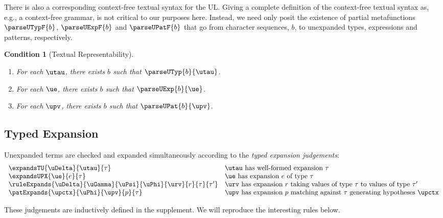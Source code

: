 \documentclass[acmsmall,10pt,review,anonymous]{acmart}\settopmatter{printfolios=true}
\newtheorem{condition}[theorem]{Condition}
\begin{document}
There is also a corresponding context-free textual syntax for the UL. 
Giving a complete definition of the context-free textual syntax as, e.g., a context-free grammar, is not critical to our purposes here. 
Instead, we need only posit the existence of partial metafunctions $\parseUTypF{b}$, $\parseUExpF{b}$ and $\parseUPatF{b}$  that go from character sequences, $b$, to unexpanded types, expressions and patterns, respectively. 
\begin{condition}[Textual Representability] ~
\begin{enumerate}[nolistsep]
\item For each $\utau$, there exists $b$ such that $\parseUTyp{b}{\utau}$. 
\item For each $\ue$, there exists $b$ such that $\parseUExp{b}{\ue}$.
\item For each $\upv$, there exists $b$ such that $\parseUPat{b}{\upv}$.
\end{enumerate}
\end{condition}

\subsection{Typed Expansion}\label{sec:typed-expansion-U}
Unexpanded terms are checked and expanded simultaneously according to the \emph{typed expansion judgements}:
\[\begin{array}{ll}
\expandsTU{\uDelta}{\utau}{\tau} & \text{$\utau$ has well-formed expansion $\tau$}\\
\expandsUPX{\ue}{e}{\tau} & \text{$\ue$ has expansion $e$ of type $\tau$}\\
\ruleExpands{\uDelta}{\uGamma}{\uPsi}{\uPhi}{\urv}{r}{\tau}{\tau'} & \text{$\urv$ has expansion $r$ taking values of type $\tau$ to values of type $\tau'$}\\
\patExpands{\upctx}{\uPhi}{\upv}{p}{\tau} & \text{$\upv$ has expansion $p$ matching against $\tau$ generating hypotheses $\upctx$}
\end{array}\]

These judgements are inductively defined in the supplement. We will reproduce the interesting rules below.
\end{document}
